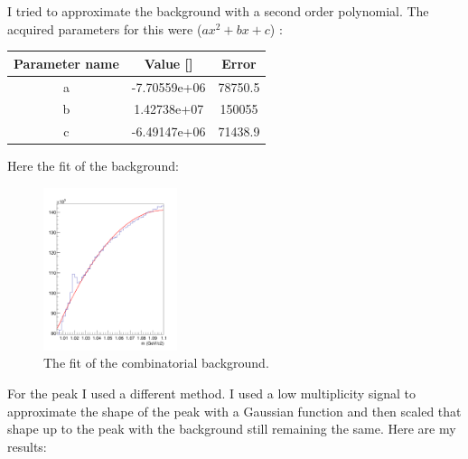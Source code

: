 \documentclass[a4paper,12pt]{article}
\begin{document}
\par I tried to approximate the background with a second order polynomial. The acquired parameters for this were ($ax^{2} + bx +c$) :
\begin{center}
	\begin{tabular}{|c|c|c|}
		\hline
		Parameter name & Value [] & Error \\
		\hline
		a & -7.70559e+06 & 78750.5 \\
		\hline
		b & 1.42738e+07 & 150055 \\
		\hline
		c & -6.49147e+06 & 71438.9 \\
		\hline
	\end{tabular}
\end{center}
\par Here the fit of the background:
\begin{figure}[H]
	\centering
	\includegraphics[width=0.35\textwidth]{combiback_fit.png}
	\caption{ The fit of the combinatorial background. }
\end{figure}
\par For the peak I used a different method. I used a low multiplicity signal to approximate the shape of the peak with a Gaussian
function and then scaled that shape up to the peak with the background still remaining the same. Here are my results:
\end{document}
